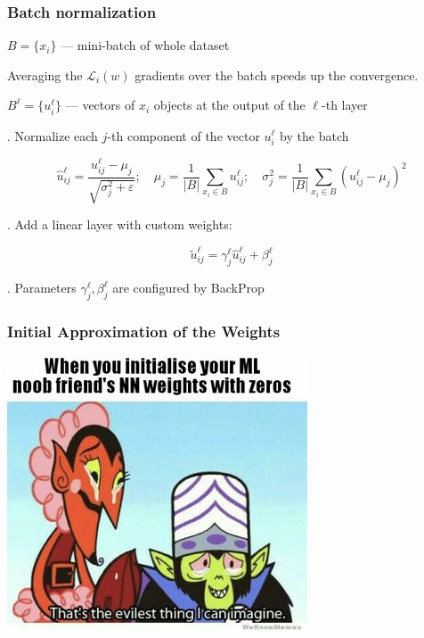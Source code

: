 \documentclass[fullscreen=true, bookmarks=true, hyperref={pdfencoding=unicode}]{beamer}
\begin{document}
\begin{frame}
  \frametitle{Batch normalization}

  $B = \{ x_i\}$ — mini-batch of whole dataset

  Averaging the $\mathcal{L}_i(w)$ gradients over the batch speeds up the convergence.

   $B^\ell = \{ u_i^\ell\}$ — vectors of $x_i$ objects at the output of the $\ell$-th layer

  . Normalize each $j$-th component of the vector $u_i^\ell$ by the batch

  $$
    \hat u_{ij}^\ell = \frac{u_{ij}^\ell - \mu_j}{\sqrt{\sigma_j^2 + \varepsilon}}; \quad
    \mu_j = \frac{1}{|B|} \sum\limits_{x_i \in B} u_{ij}^\ell; \quad
    \sigma_j^2 = \frac{1}{|B|} \sum\limits_{x_i \in B} (u_{ij}^\ell - \mu_j)^2
  $$

  . Add a linear layer with custom weights:

   $$ \tilde u_{ij}^\ell = \gamma_j^\ell \hat u_{ij}^\ell + \beta_j^\ell $$

  . Parameters $\gamma_j^\ell, \beta_j^\ell$ are configured by BackProp


\end{frame}


\begin{frame}
  \frametitle{Initial Approximation of the Weights}
  \begin{center}
    \includegraphics[keepaspectratio,
                     width=.4\paperwidth]{weight_init_meme.jpg}
  \end{center}


\end{frame}
\end{document}
